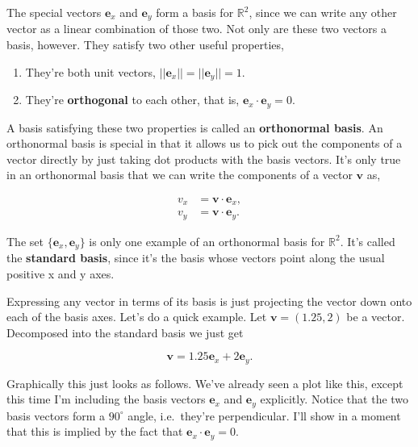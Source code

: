 \documentclass[
  letterpaper,
  DIV=11,
  numbers=noendperiod]{scrreprt}
\providecommand{\tightlist}{%
  \setlength{\itemsep}{0pt}\setlength{\parskip}{0pt}}\usepackage{longtable,booktabs,array}
\begin{document}
The special vectors \(\mathbf{e}_x\) and \(\mathbf{e}_y\) form a basis
for \(\mathbb{R}^2\), since we can write any other vector as a linear
combination of those two. Not only are these two vectors a basis,
however. They satisfy two other useful properties,

\begin{enumerate}
\def\labelenumi{\arabic{enumi}.}
\tightlist
\item
  They're both unit vectors,
  \(||\mathbf{e}_x|| = ||\mathbf{e}_y|| = 1\).
\item
  They're \textbf{orthogonal} to each other, that is,
  \(\mathbf{e}_x \cdot \mathbf{e}_y = 0\).
\end{enumerate}

A basis satisfying these two properties is called an \textbf{orthonormal
basis}. An orthonormal basis is special in that it allows us to pick out
the components of a vector directly by just taking dot products with the
basis vectors. It's only true in an orthonormal basis that we can write
the components of a vector \(\mathbf{v}\) as,

\begin{align*}
v_x &= \mathbf{v} \cdot \mathbf{e}_x, \\
v_y &= \mathbf{v} \cdot \mathbf{e}_y.
\end{align*}

The set \(\{\mathbf{e}_x, \mathbf{e}_y\}\) is only one example of an
orthonormal basis for \(\mathbb{R}^2\). It's called the \textbf{standard
basis}, since it's the basis whose vectors point along the usual
positive x and y axes.

Expressing any vector in terms of its basis is just projecting the
vector down onto each of the basis axes. Let's do a quick example. Let
\(\mathbf{v}=(1.25,2)\) be a vector. Decomposed into the standard basis
we just get

\[\mathbf{v} = 1.25 \mathbf{e}_x + 2 \mathbf{e}_y.\]

Graphically this just looks as follows. We've already seen a plot like
this, except this time I'm including the basis vectors \(\mathbf{e}_x\)
and \(\mathbf{e}_y\) explicitly. Notice that the two basis vectors form
a \(90^\circ\) angle, i.e.~they're perpendicular. I'll show in a moment
that this is implied by the fact that
\(\mathbf{e}_x \cdot \mathbf{e}_y = 0\).
\end{document}
